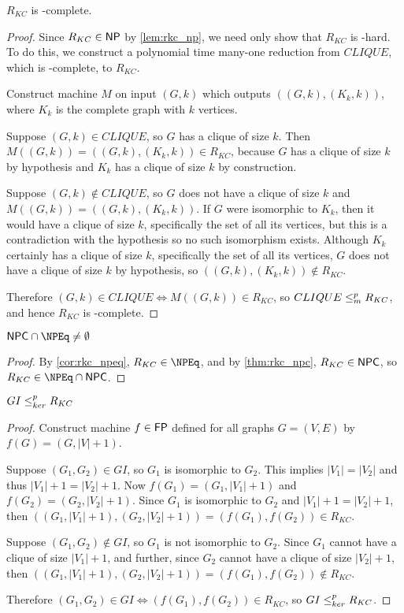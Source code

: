\begin{theorem}\label{thm:rkc_npc}$R_{KC}$ is \NP-complete.\end{theorem}
\begin{proof}
  Since $R_{KC}\in{\ensuremath{\mathsf{NP}}}$ by \autoref{lem:rkc_np}, we need only show that $R_{KC}$
  is \NP-hard. To do this, we construct a polynomial time many-one reduction
  from $CLIQUE$, which is \NP-complete, to $R_{KC}$.

  Construct machine $M$ on input $(G, k)$ which outputs $((G, k), (K_k, k))$,
  where $K_k$ is the complete graph with $k$ vertices.

  Suppose $(G,k)\in CLIQUE$, so $G$ has a clique of size $k$. Then
  $M((G,k))=((G,k), (K_k, k))\in R_{KC}$, because $G$ has a clique of size
  $k$ by hypothesis and $K_k$ has a clique of size $k$ by construction.
  
  Suppose $(G,k)\notin CLIQUE$, so $G$ does not have a clique of size $k$ and
  $M((G,k))=((G,k), (K_k, k))$. If $G$ were isomorphic to $K_k$, then it would
  have a clique of size $k$, specifically the set of all its vertices, but this
  is a contradiction with the hypothesis so no such isomorphism
  exists. Although $K_k$ certainly has a clique of size $k$, specifically the
  set of all its vertices, $G$ does not have a clique of size $k$ by
  hypothesis, so $((G, k), (K_k, k))\notin R_{KC}$.
  
  Therefore $(G,k)\in CLIQUE\iff M((G,k))\in R_{KC}$, so $CLIQUE\leq^{p}_{m} R_{KC}$,
  and hence $R_{KC}$ is \NP-complete.
\end{proof}

\begin{theorem}$\NPC\cap\NPEq\neq\emptyset$\end{theorem}
\begin{proof}
  By \autoref{cor:rkc_npeq}, $R_{KC}\in\NPEq$, and by \autoref{thm:rkc_npc},
  $R_{KC}\in{\ensuremath{\mathsf{NPC}}}$, so $R_{KC}\in\NPEq\cap\NPC$.
\end{proof}

\begin{theorem}$GI\leq^{p}_{ker} R_{KC}$\end{theorem}
\begin{proof}
  Construct machine $f\in{\ensuremath{\mathsf{FP}}}$ defined for all graphs $G=(V,E)$ by
  $f(G)=(G,|V|+1)$.

  Suppose $(G_1, G_2)\in GI$, so $G_1$ is isomorphic to $G_2$. This implies
  $|V_1|=|V_2|$ and thus $|V_1|+1=|V_2|+1$. Now $f(G_1)=(G_1, |V_1|+1)$ and
  $f(G_2)=(G_2, |V_2|+1)$. Since $G_1$ is isomorphic to $G_2$ and
  $|V_1|+1=|V_2|+1$, then $((G_1, |V_1|+1),(G_2, |V_2|+1))=(f(G_1), f(G_2))\in
  R_{KC}$.
  
  Suppose $(G_1, G_2)\notin GI$, so $G_1$ is not isomorphic to $G_2$. Since
  $G_1$ cannot have a clique of size $|V_1|+1$, and further, since $G_2$ cannot
  have a clique of size $|V_2|+1$, then $((G_1, |V_1|+1), (G_2,
  |V_2|+1))=(f(G_1), f(G_2))\notin R_{KC}$.

  Therefore $(G_1, G_2)\in GI\iff (f(G_1), f(G_2))\in R_{KC}$, so $GI\leq^{p}_{ker}
  R_{KC}$.
\end{proof}


